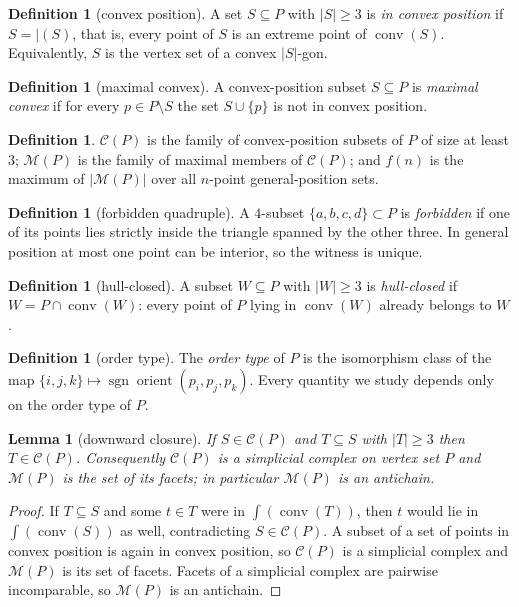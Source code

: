 \documentclass[11pt,a4paper]{article}
\newtheorem{lemma}[theorem]{Lemma}
\theoremstyle{definition}
\newtheorem{definition}[theorem]{Definition}
\newcommand{\conv}{\operatorname{conv}}
\newcommand{\M}{\mathcal{M}}
\newcommand{\CP}{\mathcal{C}}
\begin{document}
\begin{definition}[convex position]
A set $S\subseteq P$ with $|S|\ge 3$ is \emph{in convex position} if
$S=\vert(S)$, that is, every point of $S$ is an extreme point of $\conv(S)$.
Equivalently, $S$ is the vertex set of a convex $|S|$-gon.
\end{definition}

\begin{definition}[maximal convex]
A convex-position subset $S\subseteq P$ is \emph{maximal convex} if for every
$p\in P\setminus S$ the set $S\cup\{p\}$ is not in convex position.
\end{definition}

\begin{definition}
$\CP(P)$ is the family of convex-position subsets of $P$ of size at least $3$;
$\M(P)$ is the family of maximal members of $\CP(P)$; and $f(n)$ is the maximum
of $|\M(P)|$ over all $n$-point general-position sets.
\end{definition}

\begin{definition}[forbidden quadruple]
A $4$-subset $\{a,b,c,d\}\subset P$ is \emph{forbidden} if one of its points lies
strictly inside the triangle spanned by the other three.  In general position at
most one point can be interior, so the witness is unique.
\end{definition}

\begin{definition}[hull-closed]
A subset $W\subseteq P$ with $|W|\ge 3$ is \emph{hull-closed} if
$W=P\cap\conv(W)$: every point of $P$ lying in $\conv(W)$ already belongs to $W$.
\end{definition}

\begin{definition}[order type]
The \emph{order type} of $P$ is the isomorphism class of the map
$\{i,j,k\}\mapsto\operatorname{sgn}\operatorname{orient}(p_i,p_j,p_k)$.  Every
quantity we study depends only on the order type of $P$.
\end{definition}

\begin{lemma}[downward closure]
\label{lem:downward}
If $S\in\CP(P)$ and $T\subseteq S$ with $|T|\ge 3$ then $T\in\CP(P)$.
Consequently $\CP(P)$ is a simplicial complex on vertex set $P$ and $\M(P)$ is the
set of its facets; in particular $\M(P)$ is an antichain.
\end{lemma}

\begin{proof}
If $T\subseteq S$ and some $t\in T$ were in $\int(\conv(T))$, then $t$ would lie
in $\int(\conv(S))$ as well, contradicting $S\in\CP(P)$.  A subset of a set of
points in convex position is again in convex position, so $\CP(P)$ is a simplicial
complex and $\M(P)$ is its set of facets.  Facets of a simplicial complex are
pairwise incomparable, so $\M(P)$ is an antichain.
\end{proof}
\end{document}
